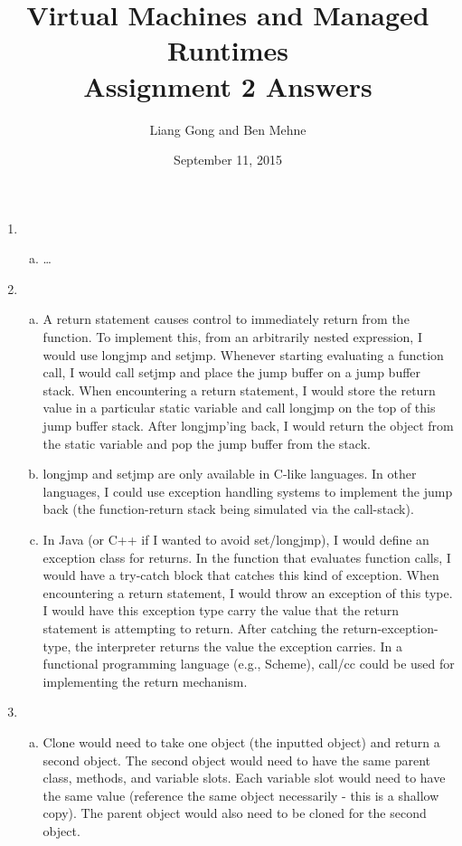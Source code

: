 \documentclass[notitlepage]{report}
\title{\vspace{-0.5in}Virtual Machines and Managed Runtimes \\ Assignment 2 Answers}
\date{\vspace{-0.5in}September 11, 2015}
\author{\vspace{-0.5in}Liang Gong and Ben Mehne\vspace{-0.5in}}
\begin{document}
\maketitle

\begin{enumerate}
	\item
		\begin{enumerate}[(a)]
			\item \dots %
		\end{enumerate}
	\item
		\begin{enumerate}[(a)]
			\item A return statement causes control to immediately return from the function.  To implement this, from an arbitrarily nested expression, I would use longjmp and setjmp.  Whenever starting evaluating a function call, I would call setjmp and place the jump buffer on a jump buffer stack.  When encountering a return statement, I would store the return value in a particular static variable and call longjmp on the top of this jump buffer stack. After longjmp'ing back, I would return the object from the static variable and pop the jump buffer from the stack.
			\item longjmp and setjmp are only available in C-like languages.  In other languages, I could use exception handling systems to implement the jump back (the function-return stack being simulated via the call-stack).
			\item In Java (or C++ if I wanted to avoid set/longjmp), I would define an exception class for returns.  In the function that evaluates function calls, I would have a try-catch block that catches this kind of exception.  When encountering a return statement, I would throw an exception of this type.  I would have this exception type carry the value that the return statement is attempting to return.  After catching the return-exception-type, the interpreter returns the value the exception carries. In a functional programming language (e.g., Scheme), call/cc could be used for implementing the return mechanism.
		\end{enumerate}
	\item
		\begin{enumerate}[(a)]
			\item Clone would need to take one object (the inputted object) and return a second object.  The second object would need to have the same parent class, methods, and variable slots.  Each variable slot would need to have the same value (reference the same object necessarily - this is a shallow copy).  The parent object would also need to be cloned for the second object.

\end{enumerate}
\end{enumerate}
\end{document}
